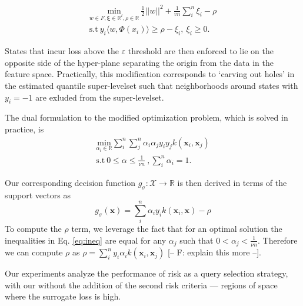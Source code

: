 \documentclass[10pt, conference]{ieeeconf}      %
\newcommand{\bx}{\mathbf{x}}
\newcommand{\acro}{SHIV}
\begin{document}
\vspace{-2ex}
\begin{align}\label{eq:primal_sup}
    \underset{w\in F, \mathbf{\xi} \in \mathbb{R}^l, \rho \in \mathbb{R}}{\mbox{min}}\: \frac{1}{2}||w||^2+\frac{1}{vn} \sum^n_i \xi_i - \rho\\
\mbox{s.t} \: y_i \langle w,\Phi(x_i)\rangle \geq \rho - \xi_i, \: \xi_i \geq 0 \label{eq:ineq}.
\end{align}

States that incur loss above the $\varepsilon$ threshold are then enforced to lie on the opposite side of the
hyper-plane separating the origin from the data in the feature space. Practically, this modification corresponds to
`carving out holes' in the estimated quantile super-levelset such that neighborhoods around states with $y_i=-1$ are
exluded from the super-levelset.

The dual formulation to the modified optimization problem, which is solved in practice, is 
\begin{align}\label{eq:dual_sup}
\underset{\alpha_i\in \mathbb{R}}{\mbox{min}} \sum_i^n \sum_j^n \alpha_i\alpha_j y_i y_jk(\bx_i,\bx_j)\\
\mbox{s.t} \: 0 \leq \alpha \leq \frac{1}{\nu n} \:, \sum_i^n \alpha_i = 1.
\end{align}

Our corresponding decision function $g_{\sigma}:\mathcal{X}\to \mathbb{R}$ is then derived in terms of the support vectors as $$g_{\sigma}(\bx) = \sum_i^n
\alpha_i y_i k(\bx_i,\bx) - \rho$$
To compute the $\rho$ term, we leverage the fact that for an optimal solution the
inequalities in Eq. \ref{eq:ineq} are equal for any $\alpha_j$ such that $0 < \alpha_j < \frac{1}{\nu n}$. Therefore we
can compute $\rho$ as  $\rho = \sum_i^n y_i \alpha_i k(\bx_i,\bx_j)$ \cite{scholkopf2001estimating} {\color{blue} [-- F:
explain this more --]}.

Our experiments analyze the performance of risk as a query selection strategy, with our without the addition of the second risk criteria --- regions of space where the surrogate loss is high.

\end{document}
